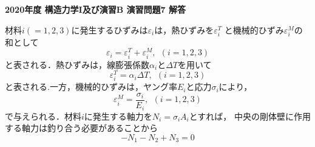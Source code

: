 ﻿\documentclass[10pt,a4j]{jarticle}
\newlength{\minitwocolumn}
\begin{document}
\newcommand{\fat}[1]{\mbox{\boldmath $#1$}}
\newcommand{\D}{\partial}
\newcommand{\w}{\omega}
\newcommand{\ga}{\alpha}
\newcommand{\gb}{\beta}
\newcommand{\gx}{\xi}
\newcommand{\gz}{\zeta}
\newcommand{\vhat}[1]{\hat{\fat{#1}}}
\newcommand{\spc}{\vspace{0.7\baselineskip}}
\newcommand{\halfspc}{\vspace{0.3\baselineskip}}

\pagestyle{empty}
\newcommand{\twofig}[2]
 {
   \begin{figure}[h]
     \begin{minipage}[t]{\minitwocolumn}
         \begin{center}   #1
         \end{center}
     \end{minipage}
         \hspace{\columnsep}
     \begin{minipage}[t]{\minitwocolumn}
         \begin{center} #2
         \end{center}
     \end{minipage}
   \end{figure}
 }
\begin{center}
{\Large \bf 2020年度 構造力学I及び演習B 演習問題7 解答} \\
\end{center}
\vspace{10mm}
材料$i(=1,2,3)$に発生するひずみは$\varepsilon_i$は，熱ひずみを$\varepsilon_i^T$
と機械的ひずみ$\varepsilon_i^M$の和として
\begin{equation}
	\varepsilon_i =
	\varepsilon_i^T 
	+
	\varepsilon_i^M, \ \ (i=1,2,3) 
	\label{eqn:eps_sum}
\end{equation}
と表される．熱ひずみは，線膨張係数$\alpha_i$と$\Delta T$を用いて
\begin{equation}
	\varepsilon_i^T= \alpha_i \Delta T, \ \ (i=1,2,3)
\end{equation}
と表される.一方，機械的ひずみは，ヤング率$E_i$と応力$\sigma_i$により，
\begin{equation}
	\varepsilon_i^M= \frac{\sigma_i}{E_i}, \ \ (i=1,2,3)
	\label{eqn:Hooke}
\end{equation}
で与えられる．材料$i$に発生する軸力を$N_i=\sigma_i A_i$とすれば，
中央の剛体壁に作用する軸力は釣り合う必要があることから
\begin{equation}
	-N_1-N_2+N_3=0 
	\label{eqn:equib}
\end{equation}
\end{document}
